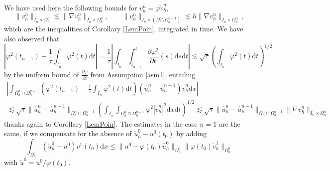\documentclass[11pt,a4paper]{article}
\theoremstyle{plain}
\theoremstyle{definition}
\theoremstyle{remark}
\numberwithin{equation}{section}
\newcommand{\dx}{\mathrm{d}x}
\newcommand{\dt}{\mathrm{d}t}
\newcommand{\ds}{\mathrm{d}s}
\begin{document}
{We have used here the following bounds for $v^n_h = \varphi \tilde{v}^n_h$, 
\[ \|v^n_h \|_{I_n \times \Omega_h^n} \lesssim \| \nabla v_h^n \|_{I_n \times
	\Omega_h^n}, \qquad \|v^n_h \|_{I_n \times (\Omega_h^n \setminus
	\Omega_h^{n - 1})} \lesssim h \| \nabla v_h^n \|_{I_n \times \Omega_h^n} \,,\]
which are the inequalities of  Corollary \ref{LemPoin}, integrated in time.  	
We have also observed that
\[ \left| \varphi^2 (t_{n - 1}) - \frac{1}{\tau}  \int_{I_n}
\varphi^2 (t) \dt \right| = \frac{1}{\tau} \left|
\int_{I_n} \int_{t_{n - 1}}^{t} \frac{\partial
	\varphi^2}{\partial t} (s) \ds \dt \right| \lesssim \sqrt{\tau}
\left( \int_{I_n} \varphi^2 (t) \dt \right)^{1 / 2} \]
by the uniform bound of $\frac{\partial \varphi }{\partial t}$ from  Assumption \ref{asm1}, entailing
\begin{multline*}
 \left| \int_{\Omega_h^n \cap \Omega_h^{n - 1}} \left( \varphi^2 (t_{n - 1})
- \frac{1}{\tau}  \int_{I_n} \varphi^2 (t) \dt \right) 
(\hat{u}_h^n - \hat{u}_h^{n - 1})  \tilde{v}^n_h \dx \right| 
\\
 \lesssim \sqrt{\tau} \| \hat{u}_h^n - \hat{u}_h^{n - 1} \|_{\Omega_h^n \cap
	\Omega_h^{n - 1}} \left( \int_{I_n} \int_{\Omega_h^n \cap
	\Omega_h^{n - 1}} \varphi^2 | \tilde{v}^n_h |^2 \dx \dt
\right)^{1 / 2} \lesssim \sqrt{\tau} \| \hat{u}_h^n - \hat{u}_h^{n - 1}
\|_{\Omega_h^n \cap \Omega_h^{n - 1}} \| \nabla v_h^n \|_{I_n\times\Omega_h^n} 
\end{multline*}
thanks again to Corollary \ref{LemPoin}.}
The estimates in the case $n = 1$ are the same, if we compensate for the
absence of $\check{u}^0_h - u^0 (t_0)$ by adding
\[ \int_{\Omega_h^0} (\check{u}^0_h - u^0) v^1 (t_0) \dx \leqslant \|
u^0 - \varphi  (t_0) \hat{u}_h^0 \|_{\Omega_h^0} \| \varphi  (t_0) \tilde{v}_h^1
\|_{\Omega_h^0} \]
with $\tilde{u}^0 = u^0 / \varphi  (t_0)$.
\end{document}
